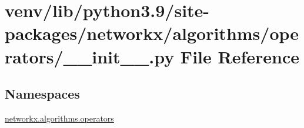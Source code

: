 \hypertarget{venv_2lib_2python3_89_2site-packages_2networkx_2algorithms_2operators_2____init_____8py}{}\section{venv/lib/python3.9/site-\/packages/networkx/algorithms/operators/\+\_\+\+\_\+init\+\_\+\+\_\+.py File Reference}
\label{venv_2lib_2python3_89_2site-packages_2networkx_2algorithms_2operators_2____init_____8py}
\subsection*{Namespaces}
\begin{DoxyCompactItemize}
\item 
 \hyperlink{namespacenetworkx_1_1algorithms_1_1operators}{networkx.\+algorithms.\+operators}
\end{DoxyCompactItemize}
